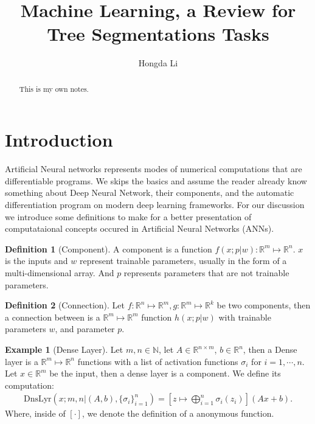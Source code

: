 \documentclass[]{article}
\title{Machine Learning, a Review for Tree Segmentations Tasks}
\author{Hongda Li}
\theoremstyle{definition}
\newtheorem{definition}{Definition}
\newtheorem{example}{Example}[subsection]
\numberwithin{equation}{subsection}
\begin{document}
\maketitle

\begin{abstract}
    This is my own notes. 
\end{abstract}


\section{Introduction}
    Artificial Neural networks represents modes of numerical computations that are differentiable programs. 
    We skips the basics and assume the reader already know something about Deep Neural Network, their components, and the automatic differentiation program on modern deep learning frameworks. 
    For our discussion we introduce some definitions to make for a better presentation of computataional concepts occured in Artificial Neural Networks (ANNs). 
    \begin{definition}[Component]
        A component is a function $f(x; p|w): \mathbb R^m \mapsto \mathbb R^n$. 
        $x$ is the inputs and $w$ represent trainable parameters, usually in the form of a multi-dimensional array. 
        And $p$ represents parameters that are not trainable parameters. 
        
    \end{definition}
    \begin{definition}[Connection]
        Let $f:\mathbb R^n \mapsto \mathbb R^m, g: \mathbb R^m \mapsto \mathbb R^k$ be two components, then a connection between is a $\mathbb R^m \mapsto \mathbb R^m$ function $h(x; p | w)$ with trainable parameters $w$, and parameter $p$. 
    \end{definition}


    \begin{example}[Dense Layer]
        Let $m, n \in \mathbb N$, let $A \in \mathbb R^{n\times m}$, $b \in \mathbb R^n$, then a Dense layer is a $\mathbb R^m \mapsto \mathbb R^n$ functions with a list of activation functions $\sigma_i$ for $i = 1, \cdots, n$. 
        Let $x \in \mathbb R^m$ be the input, then a dense layer is a component. We define its computation: 
        $$
        \begin{aligned}
            \text{DnsLyr}(x ; m, n | (A, b), \{\sigma_i\}_{i=1}^n) = 
            \left[
                z \mapsto \bigoplus_{i = 1}^n\sigma_i(z_i)
            \right]
            \left(
                Ax + b
            \right). 
        \end{aligned}
        $$
        Where, inside of $[\cdot]$, we denote the definition of a anonymous function. 
    \end{example}
    
\end{document}
